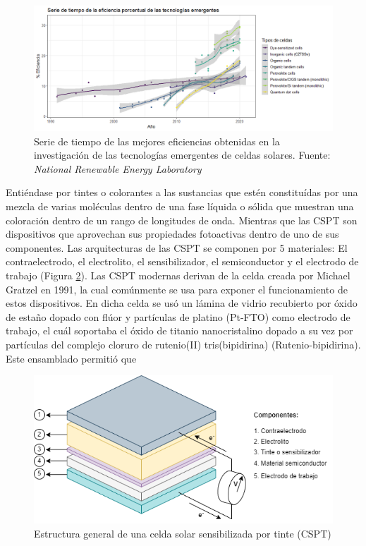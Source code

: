 \begin{figure}[h!]
    \includegraphics[scale=0.5]{img/SeriesEmergentes.png}
    \caption{Serie de tiempo de las mejores eficiencias obtenidas en la investigación de las tecnologías emergentes de celdas solares.
    Fuente: \textit{National Renewable Energy Laboratory} \cite{nrel}}
    \label{img:SerieEmergente}
\end{figure}

Entiéndase por tintes o colorantes a las sustancias que estén constituídas por una mezcla de varias moléculas dentro de una fase líquida o sólida que muestran una coloración dentro de un rango de longitudes de onda. Mientras que las CSPT son dispositivos que aprovechan sus propiedades fotoactivas dentro de uno de sus componentes. Las arquitecturas de las CSPT se componen por 5 materiales: El contraelectrodo, el electrolito, el sensibilizador, el semiconductor y el electrodo de trabajo (Figura \ref{img:CSPT}). Las CSPT modernas derivan de la celda creada por Michael Gratzel en 1991, la cual comúnmente se usa para exponer el funcionamiento de estos dispositivos. En dicha celda se usó un lámina de vidrio recubierto por óxido de estaño dopado con flúor y partículas de platino (Pt-FTO) como electrodo de trabajo, el cuál soportaba el óxido de titanio nanocristalino dopado a su vez por partículas del complejo cloruro de rutenio(II) tris(bipidirina) (Rutenio-bipidirina). Este ensamblado permitió que 

\begin{figure}[h!]
    \includegraphics[scale=0.65]{img/DSSC.png}
    \caption{Estructura general de una celda solar sensibilizada por tinte (CSPT) \cite{owidenergy}}
    \label{img:CSPT}
\end{figure}



